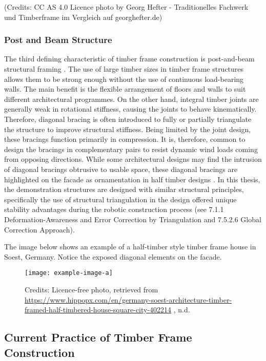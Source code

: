 (Credits: CC AS 4.0 Licence photo by Georg Hefter - Traditionelles Fachwerk und Timberframe im Vergleich auf georghefter.de)

\subsubsection{Post and Beam Structure}
\label{subsec:timberframeconstruction/postandbeamstructure}

The third defining characteristic of timber frame construction is post-and-beam structural framing \parencite{jacksobonHistoricAmericanTimber2014,sobonTimberFrameConstruction1984}. The use of large timber sizes in timber frame structures allows them to be strong enough without the use of continuous load-bearing walls. The main benefit is the flexible arrangement of floors and walls to suit different architectural programmes. 
On the other hand, integral timber joints are generally weak in rotational stiffness, causing the joints to behave kinematically. Therefore, diagonal bracing is often introduced to fully or partially triangulate the structure to improve structural stiffness. Being limited by the joint design, these bracings function primarily in compression. It is, therefore, common to design the bracings in complementary pairs to resist dynamic wind loads coming from opposing directions. While some architectural designs may find the intrusion of diagonal bracings obtrusive to usable space, these diagonal bracings are highlighted on the facade as ornamentation in half timber designs \parencite{gernerFachwerkEntwicklungGefuege1979}. In this thesis, the demonstration structures are designed with similar structural principles, specifically the use of structural triangulation in the design offered unique stability advantages during the robotic construction process (see 7.1.1 Deformation-Awareness and Error Correction by Triangulation and 7.5.2.6 Global Correction Approach).

The image below shows an example of a half-timber style timber frame house in Soest, Germany. Notice the exposed diagonal elements on the facade.

\begin{figure}[ht]
    \texttt{[image: example-image-a]}
    \caption{
        Credits: Licence-free photo, retrieved from \url{https://www.hippopx.com/en/germany-soest-architecture-timber-framed-half-timbered-house-square-city-402214} , n.d.}
\end{figure}
    
\subsection{Current Practice of Timber Frame Construction}

